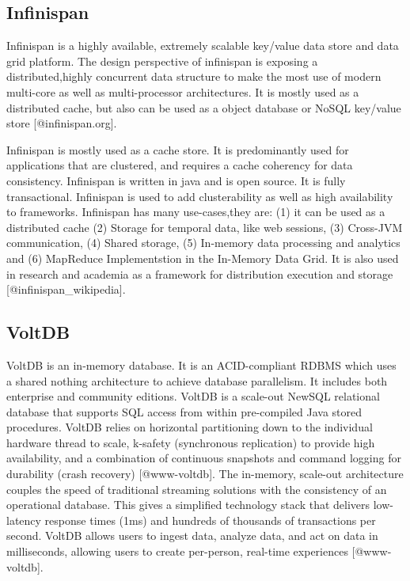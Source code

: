 \subsection{Infinispan}

Infinispan is a highly available, extremely scalable key/value data
store and data grid platform. The design perspective of infinispan is
exposing a distributed,highly concurrent data structure to make the
most use of modern multi-core as well as multi-processor
architectures. It is mostly used as a distributed cache, but also can
be used as a object database or NoSQL key/value
store [@infinispan.org].

Infinispan is mostly used as a cache store. It is predominantly used
for applications that are clustered, and requires a cache coherency
for data consistency. Infinispan is written in java and is open
source. It is fully transactional. Infinispan is used to add
clusterability as well as high availability to frameworks.  Infinispan
has many use-cases,they are: (1) it can be used as a distributed cache
(2) Storage for temporal data, like web sessions, (3) Cross-JVM
communication, (4) Shared storage, (5) In-memory data processing and
analytics and (6) MapReduce Implementstion in the In-Memory Data
Grid. It is also used in research and academia as a framework for
distribution execution and storage [@infinispan_wikipedia].
     
\subsection{VoltDB}

VoltDB is an in-memory database. It is an ACID-compliant RDBMS which
uses a shared nothing architecture to achieve database parallelism. It
includes both enterprise and community editions. VoltDB is a scale-out
NewSQL relational database that supports SQL access from within
pre-compiled Java stored procedures.  VoltDB relies on horizontal
partitioning down to the individual hardware thread to scale, k-safety
(synchronous replication) to provide high availability, and a
combination of continuous snapshots and command logging for durability
(crash recovery) [@www-voltdb]. The in-memory, scale-out
architecture couples the speed of traditional streaming solutions with
the consistency of an operational database. This gives a simplified
technology stack that delivers low-latency response times (1ms) and
hundreds of thousands of transactions per second. VoltDB allows users
to ingest data, analyze data, and act on data in milliseconds,
allowing users to create per-person, real-time
experiences [@www-voltdb].

